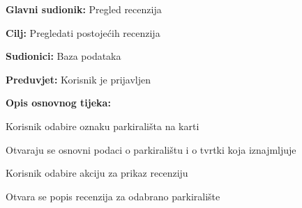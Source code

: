 \noindent {}
\begin{packed_item}
	
	\item \textbf{Glavni sudionik:} Pregled recenzija
	\item  \textbf{Cilj:} Pregledati postojećih recenzija
	\item  \textbf{Sudionici:} Baza podataka
	\item  \textbf{Preduvjet:} Korisnik je prijavljen
	\item  \textbf{Opis osnovnog tijeka:}
	
	\item[] \begin{packed_enum}
		
		\item Korisnik odabire oznaku parkirališta na karti
		\item Otvaraju se osnovni podaci o parkiralištu i o tvrtki koja iznajmljuje
		\item Korisnik odabire akciju za prikaz recenziju
		\item Otvara se popis recenzija za odabrano parkiralište
	
	\end{packed_enum}
\end{packed_item}

